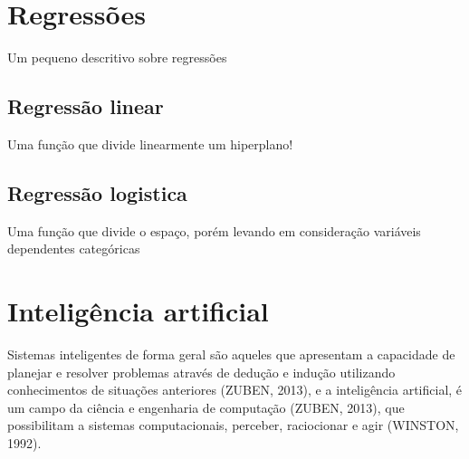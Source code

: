 

\section{Regressões}

\par Um pequeno descritivo sobre regressões

\subsection{Regressão linear}

\par Uma função que divide linearmente um hiperplano!

\subsection{Regressão logistica}

\par Uma função que divide o espaço, porém levando em consideração variáveis dependentes categóricas

\section{Inteligência artificial}



Sistemas inteligentes de forma geral são aqueles que apresentam a capacidade de planejar e resolver problemas através de dedução e indução utilizando conhecimentos de situações anteriores (ZUBEN, 2013), e a inteligência artificial, é um campo da ciência e engenharia de computação (ZUBEN, 2013), que possibilitam a sistemas computacionais, perceber, raciocionar e agir (WINSTON, 1992).

